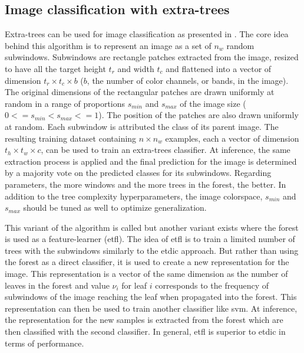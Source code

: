 \subsection{Image classification with extra-trees}
\label{ssec:backml:et_image}

Extra-trees can be used for image classification as presented in \parencite{maree2016towards}. The core idea behind this algorithm is to represent an image as a set of $n_w$ random subwindows. Subwindows are rectangle patches extracted from the image, resized to have all the target height $t_r$ and width $t_c$ and flattened into a vector of dimension $t_r \times t_c \times b$ ($b$, the number of color channels, or bands, in the image). The original dimensions of the rectangular patches are drawn uniformly at random in a range of proportions $s_{min}$ and $s_{max}$ of the image size ($0 <= s_{min} < s_{max} <= 1$). The position of the patches are also drawn uniformly at random. Each subwindow is attributed the class of its parent image. The resulting training dataset containing $n \times n_w$ examples, each a vector of dimension $t_h \times t_w \times c$, can be used to train an extra-trees classifier. At inference, the same extraction process is applied and the final prediction for the image is determined by a majority vote on the predicted classes for its subwindows. Regarding parameters, the more windows and the more trees in the forest, the better. In addition to the tree complexity hyperparameters, the image colorspace, $s_{min}$ and $s_{max}$ should be tuned as well to optimize generalization.

This variant of the algorithm is called  but another variant exists where the forest is used as a feature-learner (\acrshort{etfl}). The idea of \acrshort{etfl} is to train a limited number of trees with the subwindows similarly to the \acrshort{etdic} approach. But rather than using the forest as a direct classifier, it is used to create a new representation for the image. This representation is a vector of the same dimension as the number of leaves in the forest and value $\nu_i$ for leaf $i$ corresponds to the frequency of subwindows of the image reaching the leaf when propagated into the forest. This representation can then be used to train another classifier like \acrshort{svm}. At inference, the representation for the new samples is extracted from the forest which are then classified with the second classifier. In general, \acrshort{etfl} is superior to \acrshort{etdic} in terms of performance.


